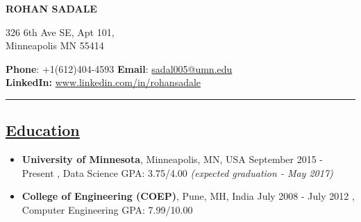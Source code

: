 \documentclass[10pt]{article}
\begin{document}

 

\begin{center}
\bfseries {\huge {\selectfont ROHAN SADALE}}
\end{center}

\vspace{14pt}

\noindent \begin{minipage}[b]{0.3\hsize}
\normalsize 326 6th Ave SE, Apt 101,  \\
\normalsize Minneapolis MN 55414
\end{minipage}
\hfill
\begin{minipage}[b]{0.50 \hsize}
{\bfseries {\normalsize Phone}}: {\normalsize {+1(612)404-4593}} \hspace{0.15in} {\bfseries {\normalsize Email}}: {\normalsize \url{sadal005@umn.edu}} \\
{\bfseries {\normalsize LinkedIn:}} \normalsize \url{www.linkedin.com/in/rohansadale}
\end{minipage}

\vspace{4pt}

\hrule
\vspace{-0.2cm}
\subsection*{\underline{Education}}
\vspace{-0.1cm}
\begin{itemize}[leftmargin=*]
\item[] {\bfseries University of Minnesota}, Minneapolis, MN, USA \hfill September 2015 - Present
, Data Science \hspace{0.2in} GPA: 3.75/4.00  \hfill {\sl (expected graduation - May 2017)}
\vspace{-0.1cm}
\item[] {\bfseries College of Engineering (COEP)}, Pune, MH, India \hfill July 2008 - July 2012  
, Computer Engineering	 \hspace{0.2in} GPA: 7.99/10.00
\end{itemize}
\end{document}

